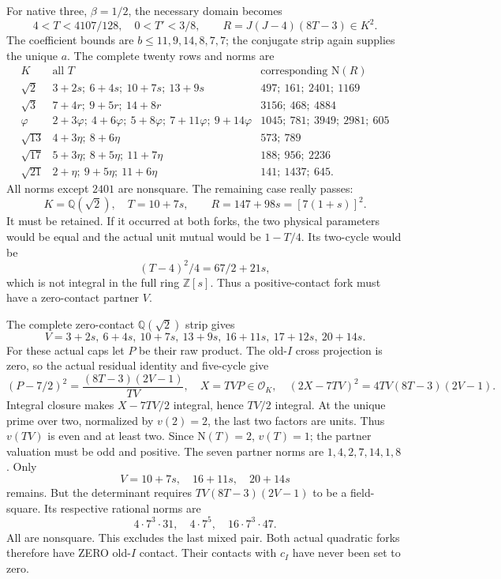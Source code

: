 \documentclass[11pt]{article}
\begin{document}
For native three, \(\beta=1/2\),
the necessary domain becomes
\[
 4<T<4107/128,\quad0<T'<3/8,\qquad
                         R=J(J-4)(8T-3)\in K^2 .
\]
The coefficient bounds are
\(b\le11,9,14,8,7,7\); the conjugate
strip again supplies the unique \(a\).
The complete twenty rows and norms are
\[
\begin{array}{c|l|l}
 K&\text{all }T&\text{corresponding }\mathrm N(R)\\ \hline
 \sqrt2&3+2s;\ 6+4s;\ 10+7s;\ 13+9s&497;\ 161;\ 2401;\ 1169\\
 \sqrt3&7+4r;\ 9+5r;\ 14+8r&3156;\ 468;\ 4884\\
 \varphi&2+3\varphi;\ 4+6\varphi;\ 5+8\varphi;\
             7+11\varphi;\ 9+14\varphi&1045;\ 781;\ 3949;\ 2981;\ 605\\
 \sqrt{13}&4+3\eta;\ 8+6\eta&573;\ 789\\
 \sqrt{17}&5+3\eta;\ 8+5\eta;\ 11+7\eta&188;\ 956;\ 2236\\
 \sqrt{21}&2+\eta;\ 9+5\eta;\ 11+6\eta&141;\ 1437;\ 645 .
\end{array}
\]
All norms except \(2401\) are
nonsquare.
The remaining case really passes:
\[
              K=\mathbb Q(\sqrt2),\quad T=10+7s,\qquad
                 R=147+98s=[7(1+s)]^2 .
\]
It must be retained.
If it occurred at both forks,
the two physical parameters would
be equal and the actual unit mutual
would be \(1-T/4\).
Its two-cycle would be
\[
                        (T-4)^2/4=67/2+21s,
\]
which is not integral in the full
ring \(\mathbb Z[s]\).
Thus a positive-contact fork must
have a zero-contact partner \(V\).

The complete zero-contact
\(\mathbb Q(\sqrt2)\) strip gives
\[
 V=3+2s,\ 6+4s,\ 10+7s,\ 13+9s,\
                        16+11s,\ 17+12s,\ 20+14s .
\]
For these actual caps let \(P\)
be their raw product.
The old-\(I\) cross projection is
zero, so the actual residual identity
and five-cycle give
\[
 (P-7/2)^2={\frac{(8T-3)(2V-1)}{TV}},\quad
 X=TVP\in\mathcal O_K,\quad
                (2X-7TV)^2=4TV(8T-3)(2V-1).
\]
Integral closure makes
\(X-7TV/2\) integral, hence \(TV/2\)
integral.
At the unique prime over two,
normalized by \(v(2)=2\), the last
two factors are units.
Thus \(v(TV)\) is even and at least
two.
Since \(\mathrm N(T)=2\), \(v(T)=1\);
the partner valuation must be odd
and positive.
The seven partner norms are
\(1,4,2,7,14,1,8\).
Only
\[
                         V=10+7s,\quad16+11s,\quad20+14s
\]
remains.
But the determinant requires
\(TV(8T-3)(2V-1)\) to be a field-square.
Its respective rational norms are
\[
                           4\cdot7^3\cdot31,\quad
                           4\cdot7^5,\quad
                           16\cdot7^3\cdot47 .
\]
All are nonsquare.
This excludes the last mixed pair.
Both actual quadratic forks
therefore have ZERO old-\(I\) contact.
Their contacts with \(c_I\) have
never been set to zero.
\end{document}
